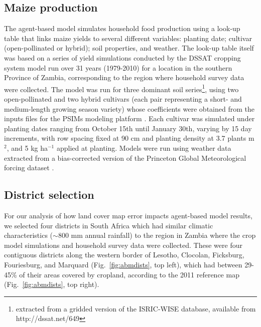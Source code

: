 \documentclass[12pt, titlepage]{article}
\begin{document}
\subsection{\large Maize production}
The agent-based model simulates household food production using a look-up table that links maize yields to several different variables: planting date; cultivar (open-pollinated or hybrid); soil properties, and weather.  The look-up table itself was based on a series of yield simulations conducted by the DSSAT cropping system model run over 31 years (1979-2010) for a location in the southern Province of Zambia, corresponding to the region where household survey data were collected. The model was run for three dominant soil series\footnote{extracted from a gridded version of the ISRIC-WISE database, available from http://dssat.net/649}, using two open-pollinated and two hybrid cultivars (each pair representing a short- and medium-length growing season variety) whose coefficients were obtained from the inputs files for the PSIMs modeling platform \citep{elliott_parallel_2014}. Each cultivar was simulated under planting dates ranging from October 15th until January 30th, varying by 15 day increments, with row spacing fixed at 90 cm and planting density at 3.7 plants m$^2$, and 5 kg ha$^{-1}$ applied at planting. Models were run using weather data extracted from a bias-corrected version of the Princeton Global Meteorological forcing dataset \citep{sheffield_development_2006,chaney_spatial_2014,estes_changing_2014}.  


\subsection{\large District selection}
For our analysis of how land cover map error impacts agent-based model results, we selected four districts in South Africa which had similar climatic characteristics ($\sim$800 mm annual rainfall) to the region in Zambia where the crop model simulations and household survey data were collected.  These were four contiguous districts along the western border of Lesotho, Clocolan, Ficksburg, Fouriesburg, and Marquard (Fig.~\ref{fig:abmdists}, top left), which had between 29-45\% of their areas covered by cropland, according to the 2011 reference map (Fig.~\ref{fig:abmdists}, top right).  
\end{document}
